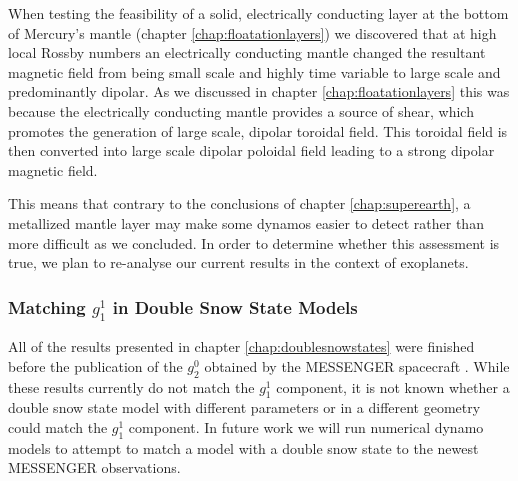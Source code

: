 When testing the feasibility of a solid, electrically conducting layer at the bottom of Mercury's mantle (chapter \ref{chap:floatationlayers}) we discovered that at high local Rossby numbers an electrically conducting mantle changed the resultant magnetic field from being small scale and highly time variable to large scale and predominantly dipolar. As we discussed in chapter \ref{chap:floatationlayers} this was because the electrically conducting mantle provides a source of shear, which promotes the generation of large scale, dipolar toroidal field. This toroidal field is then converted into large scale dipolar poloidal field leading to a strong dipolar magnetic field. 

This means that contrary to the conclusions of chapter \ref{chap:superearth}, a metallized mantle layer may make some dynamos easier to detect rather than more difficult as we concluded. In order to determine whether this assessment is true, we plan to re-analyse our current results in the context of exoplanets.

\subsubsection{Matching $g_1^1$ in Double Snow State Models}
All of the results presented in chapter \ref{chap:doublesnowstates} were finished before the publication of the $g_2^0$ obtained by the MESSENGER spacecraft \citep{anderson2012}. While these results currently do not match the $g_1^1$ component, it is not known whether a double snow state model with different parameters or in a different geometry could match the $g_1^1$ component. In future work we will run numerical dynamo models to attempt to match a model with a double snow state to the newest MESSENGER observations.